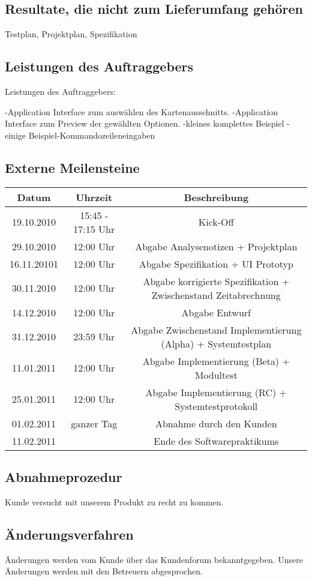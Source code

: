 \documentclass[a4paper,10pt]{scrartcl}
\begin{document}
\subsection{Resultate, die nicht zum Lieferumfang gehören}
Testplan, Projektplan, Spezifikation
\subsection{Leistungen des Auftraggebers}
Leistungen des Auftraggebers:

-Application Interface zum auswählen des Kartenausschnitts.
-Application Interface zum Preview der gewählten Optionen.
-kleines komplettes Beispiel
-einige Beispiel-Kommandozeileneingaben
\subsection{Externe Meilensteine}
\begin{tabular}{|c|c|c|}
\hline Datum & Uhrzeit & Beschreibung\\ 
\hline 19.10.2010 & 15:45 - 17:15 Uhr & Kick-Off\\ 
\hline 29.10.2010 & 12:00 Uhr & Abgabe Analysenotizen + Projektplan\\ 
\hline 16.11.20101 & 12:00 Uhr & Abgabe Spezifikation + UI Prototyp\\ 
\hline 30.11.2010 & 12:00 Uhr & Abgabe korrigierte Spezifikation + Zwischenstand Zeitabrechnung\\ 
\hline 14.12.2010 & 12:00 Uhr & Abgabe Entwurf\\ 
\hline 31.12.2010 & 23:59 Uhr & Abgabe Zwischenstand Implementierung (Alpha) + Systemtestplan\\ 
\hline 11.01.2011 & 12:00 Uhr & Abgabe Implementierung (Beta) + Modultest\\ 
\hline 25.01.2011 & 12:00 Uhr & Abgabe Implementierung (RC) + Systemtestprotokoll\\ 
\hline 01.02.2011 & ganzer Tag & Abnahme durch den Kunden\\ 
\hline 11.02.2011 & & Ende des Softwarepraktikums\\ 
\hline 
\end{tabular} 
\subsection{Abnahmeprozedur}
Kunde versucht mit unserem Produkt zu recht zu kommen.
\subsection{Änderungsverfahren}
Änderungen werden vom Kunde über das Kundenforum bekanntgegeben. Unsere Änderungen werden mit den Betreuern abgesprochen.
\end{document}

